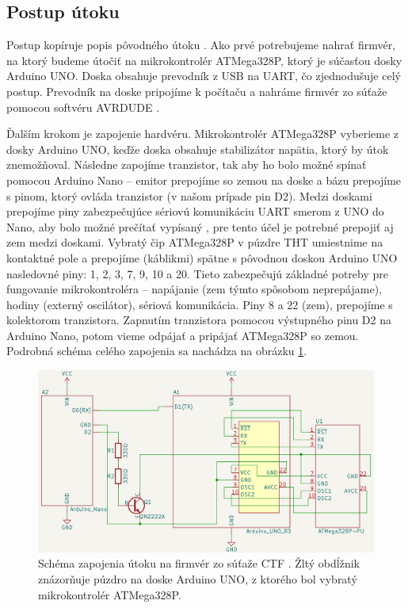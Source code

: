 \subsection{Postup útoku}
Postup kopíruje popis pôvodného útoku \cite{vccOnTheCheap}. Ako prvé potrebujeme nahrať firmvér, na ktorý budeme útočiť na mikrokontrolér ATMega328P, ktorý je súčasťou dosky Arduino UNO. Doska obsahuje prevodník z USB na UART, čo zjednodušuje celý postup. Prevodník na doske pripojíme k počítaču a nahráme firmvér zo súťaže pomocou softvéru AVRDUDE \cite{vccOnTheCheap}.

Ďalším krokom je zapojenie hardvéru. Mikrokontrolér ATMega328P vyberieme z dosky Arduino UNO, keďže doska obsahuje stabilizátor napätia, ktorý by útok znemožňoval. Následne zapojíme tranzistor, tak aby ho bolo možné spínať pomocou Arduino Nano -- emitor prepojíme so zemou na doske a bázu prepojíme s pinom, ktorý ovláda tranzistor (v našom prípade pin D2). Medzi doskami prepojíme piny zabezpečujúce sériovú komunikáciu UART smerom z UNO do Nano, aby bolo možné prečítať vypísaný , pre tento účel je potrebné prepojiť aj zem medzi doskami. Vybratý čip ATMega328P v púzdre THT umiestnime na kontaktné pole a prepojíme (káblikmi) spätne s pôvodnou doskou Arduino UNO nasledovné piny: 1, 2, 3, 7, 9, 10 a 20. Tieto zabezpečujú základné potreby pre fungovanie mikrokontroléra -- napájanie (zem týmto spôsobom neprepájame), hodiny (externý oscilátor), sériová komunikácia. Piny 8 a 22 (zem), prepojíme s kolektorom tranzistora. Zapnutím tranzistora pomocou výstupného pinu D2 na Arduino Nano, potom vieme odpájať a pripájať ATMega328P so zemou. Podrobná schéma celého zapojenia sa nachádza na obrázku \ref{obr:schemeCTF}.

\begin{figure}
    \centerline{\includegraphics[width=1\textwidth]{images/schemeCTF.png}}
    \caption[Schéma zapojenia útoku na firmvér zo súťaže CTF]{Schéma zapojenia útoku na firmvér zo súťaže CTF \cite{vccOnTheCheap}. Žltý obdĺžnik znázorňuje púzdro na doske Arduino UNO, z ktorého bol vybratý mikrokontrolér ATMega328P.}
    \label{obr:schemeCTF}
\end{figure}

